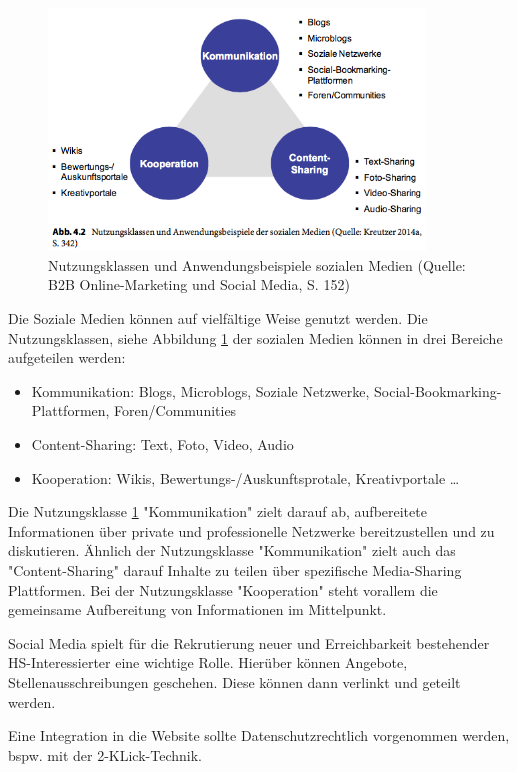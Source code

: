 \documentclass[a4paper, 12pt]{scrreprt}
\begin{document}
\begin{figure}[h!]
	\centering
	\includegraphics[width=10cm]{bilder_aurel/nutzungsklassen}
	\caption{Nutzungsklassen und Anwendungsbeispiele sozialen Medien (Quelle: B2B Online-Marketing und Social Media, S. 152)}
	\label{fig_nutzungsklassen}
\end{figure}

Die Soziale Medien können auf vielfältige Weise genutzt werden. Die Nutzungsklassen, siehe Abbildung \ref{fig_nutzungsklassen} der sozialen Medien können in drei Bereiche aufgeteilen werden:


\begin{itemize}
  \item Kommunikation: Blogs, Microblogs, Soziale Netzwerke, Social-Bookmarking-Plattformen, Foren/Communities
  \item Content-Sharing: Text, Foto, Video, Audio
  \item Kooperation: Wikis, Bewertungs-/Auskunftsprotale, Kreativportale \ldots
\end{itemize}

Die Nutzungsklasse \ref{fig_nutzungsklassen} "Kommunikation" zielt darauf ab, aufbereitete Informationen über private und professionelle Netzwerke bereitzustellen und zu diskutieren.
Ähnlich der Nutzungsklasse "Kommunikation" zielt auch das "Content-Sharing" darauf Inhalte zu teilen über spezifische Media-Sharing Plattformen.
Bei der Nutzungsklasse "Kooperation" steht vorallem die gemeinsame Aufbereitung von Informationen im Mittelpunkt.

Social Media spielt für die Rekrutierung neuer und Erreichbarkeit bestehender HS-Interessierter eine wichtige Rolle. Hierüber können Angebote, Stellenausschreibungen geschehen. Diese können dann verlinkt und geteilt werden. 

Eine Integration in die Website sollte Datenschutzrechtlich vorgenommen werden, bspw. mit der 2-KLick-Technik.
\end{document}
